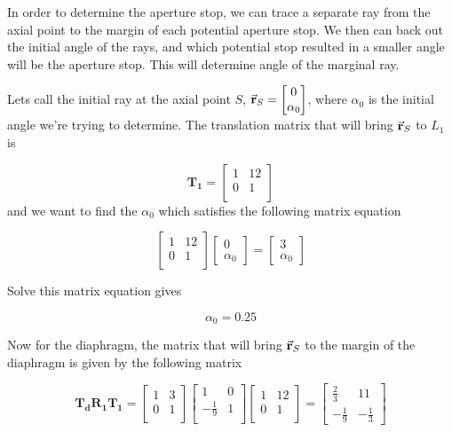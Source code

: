\documentclass[a4paper]{article}
\begin{document}
In order to determine the aperture stop, we can trace a separate ray from the axial point to the margin of each potential aperture stop. We then can back out the initial angle of the rays, and which potential stop resulted in a smaller angle will be the aperture stop. This will determine angle of the marginal ray.

Lets call the initial ray at the axial point $S$, $\va{r}_S = \begin{bmatrix}
    0 \\
    \alpha_0
\end{bmatrix} $, where $\alpha_0$ is the initial angle we're trying to determine. The translation matrix that will bring $\va{r}_S$ to $L_1$ is

$$ \bm{T_1} = \begin{bmatrix}
    1 & 12 \\
    0 & 1 \\
\end{bmatrix} $$
and we want to find the $\alpha_0$ which satisfies the following matrix equation

$$ \begin{bmatrix}
    1 & 12 \\
    0 & 1 \\
\end{bmatrix}
\begin{bmatrix}
    0 \\
    \alpha_0
\end{bmatrix} =
\begin{bmatrix}
    3 \\
    \alpha_0
\end{bmatrix} $$

Solve this matrix equation gives

$$ \alpha_0 = 0.25 $$

Now for the diaphragm, the matrix that will bring $\va{r}_S$ to the margin of the diaphragm is given by the following matrix

$$ \bm{T_d}\bm{R_1}\bm{T_1} = \begin{bmatrix}
    1 & 3 \\
    0 & 1 \\
\end{bmatrix}
\begin{bmatrix}
    1 & 0 \\
    -\frac{1}{9} & 1 \\
\end{bmatrix}
\begin{bmatrix}
    1 & 12 \\
    0 & 1 \\
\end{bmatrix} = 
\begin{bmatrix}
    \frac{2}{3} & 11\\
    - \frac{1}{9} & - \frac{1}{3}
\end{bmatrix}$$
\end{document}
